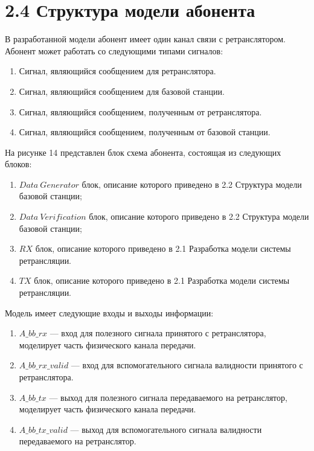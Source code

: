 \section*{\large{2.4 Структура модели абонента}}

\begin{onehalfspace}

В разработанной модели абонент имеет один канал связи с ретранслятором. Абонент может работать со следующими типами сигналов: 
		\begin{enumerate} 	
		\item Сигнал, являющийся сообщением для ретранслятора. 
	
		\item Сигнал, являющийся сообщением для базовой станции.

	
		\item Сигнал, являющийся сообщением, полученным от ретранслятора.

            \item Сигнал, являющийся сообщением, полученным от базовой станции. 
            
	\end{enumerate}



На рисунке 14 представлен блок схема абонента, состоящая из следующих блоков: 

\begin{enumerate} 	
	\item $Data \ Generator$ блок, описание которого приведено в 2.2 Структура модели базовой станции; 
	
	\item  $Data \ Verification$ блок, описание которого приведено в 2.2 Структура модели базовой станции;
	
	\item  $RX$ блок, описание которого приведено в 2.1 Разработка модели системы ретрансляции.
	
	\item  $TX$ блок, описание которого приведено в 2.1 Разработка модели системы ретрансляции.
\end{enumerate}

Модель имеет следующие входы и выходы информации: 
    \begin{enumerate} 	
		\item $A\_bb\_rx$ — вход для полезного сигнала принятого с ретранслятора, моделирует часть физического канала передачи.
  
            \item $A\_bb\_rx\_valid$ — вход для вспомогательного сигнала валидности принятого с ретранслятора.

            \item $A\_bb\_tx$ — выход для полезного сигнала передаваемого на ретранслятор, моделирует часть физического канала передачи.
  
            \item $A\_bb\_tx\_valid$ — выход для вспомогательного сигнала валидности передаваемого на ретранслятор.
\end{enumerate}

\end{onehalfspace}

